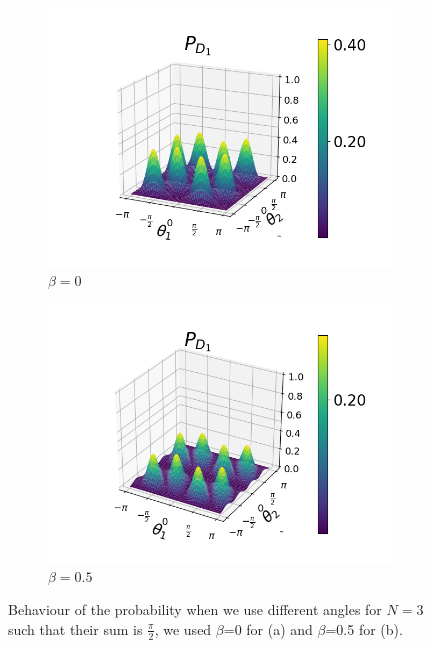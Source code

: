 \documentclass[12pt]{book}
\begin{document}
\begin{figure}[!t]
\begin{subfigure}[b]{0.4\linewidth}
\includegraphics[width=\linewidth]{images/beta_theta2.png}
\caption{$\beta=0$}
\label{fig:BS1}
\end{subfigure}
\begin{subfigure}[b]{0.4\linewidth}
\includegraphics[width=\linewidth]{images/beta_theta.png}
\caption{$\beta=0.5$}
\label{fig:westminster_aerea}
\end{subfigure}

\caption{Behaviour of the probability when we use different angles for $N=3$ such that their sum is $\frac{\pi}{2}$, we used $\beta$=0 for (a) and $\beta$=0.5 for (b).}
\label{recidito}
\end{figure}
\end{document}
